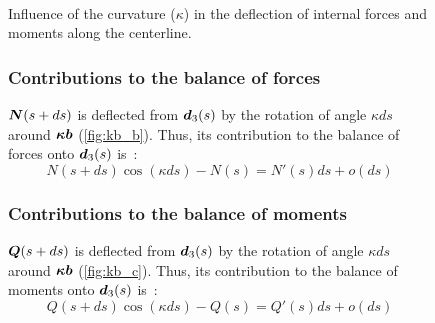 \begin{figure}[p]
  \begin{leftfullpage}
    \captionsetup[subfloat]{captionskip=10pt}
     	\centering
     	 \\
	\vspace{30pt}
	\vspace{30pt}
	\caption{Influence of the curvature ($\kappa$) in the deflection of internal forces and moments along the centerline.}     
	\label{fig:kb}
 \end{leftfullpage}
\end{figure}
\begin{figure}[p]
	\begin{fullpage}
	\subsubsection{Contributions to the balance of forces}
	\vspace{10pt}
	$\boldsymbol{N}(s+ds)$ is deflected from $\boldsymbol{d}_3(s)$ by the rotation of angle $\kappa ds$ around $\boldsymbol{\kappa b}$ (\cref{fig:kb_b}). Thus, its contribution to the balance of forces onto $\boldsymbol{d}_3(s)$ is~: 
	\begin{equation*}
		N(s+ds) \cos(\kappa ds) - N(s) = N'(s) ds + o(ds)
	\end{equation*}	
	\vspace{10pt}
	
	\subsubsection{Contributions to the balance of moments}
	\vspace{10pt}
	$\boldsymbol{Q}(s+ds)$ is deflected from $\boldsymbol{d}_3(s)$ by the rotation of angle $\kappa ds$ around $\boldsymbol{\kappa b}$ (\cref{fig:kb_c}). Thus, its contribution to the balance of moments onto $\boldsymbol{d}_3(s)$ is~: 
	\begin{equation*}
		Q(s+ds) \cos(\kappa ds) - Q(s) = Q'(s) ds + o(ds)
	\end{equation*}	
	  \end{fullpage}
\end{figure}

 
